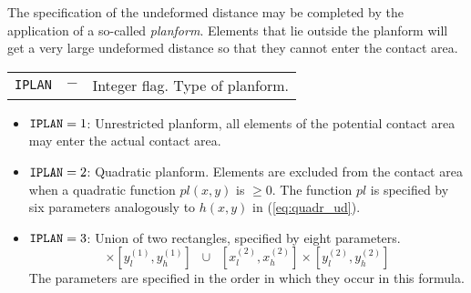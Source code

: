 \documentclass[12pt]{report}
\renewcommand{\magenta}[1]{}
\newenvironment{inputvars}{\vspace{0.4\baselineskip}%

\begin{tabular}{>{\raggedright}p{22mm}p{19mm}p{113mm}}}{
\end{tabular}

}
\newcommand{\inpvar}[3]{{\small\tt #1} & $#2$ & #3 \\[1ex]}
\begin{document}
The specification of the undeformed distance may be completed by the
application of a so-called {\em planform}. Elements that lie outside the
planform will get a very large undeformed distance so that they cannot
enter the contact area.
\begin{inputvars}
\inpvar{IPLAN}{-}{Integer flag. Type of planform.}
\end{inputvars}
\vspace{-2ex}
\begin{itemize}
\item ${\tt IPLAN}=1$: Unrestricted planform, all elements of the potential
        contact area may enter the actual contact area.
\item ${\tt IPLAN}=2$: Quadratic planform. Elements are excluded from the
        contact area when a qua\-dra\-tic function $pl(x,y)$ is $\ge 0$. The
        function $pl$ is specified by six parameters analogously to $h(x,y)$
        in (\ref{eq:quadr_ud}).
\item ${\tt IPLAN}=3$: Union of two rectangles, specified by eight parameters.
\begin{equation}
        [ x_l^{(1)}, x_h^{(1)} ] \times [ y_l^{(1)}, y_h^{(1)} ]
        \;\; \cup \;\;
        [ x_l^{(2)}, x_h^{(2)} ] \times [ y_l^{(2)}, y_h^{(2)} ]
\end{equation}
The parameters are specified in the order in which they occur in this
formula.
\magenta{
\item ${\tt IPLAN}=4$: Weighted interaction between $n_{patch}$ different
contact patches. Contact patches are given as rectangles
$[x_l^{(i)},x_h^{(i)}] \times[y_l^{(i)},y_h^{(i)}], i=1,n_{patch}$. 
The effect of pressures on normal displacements of different patches is
multiplied by factors $f_{i,j}\in[0,1]$, e.g.\
\begin{equation}
        n_{patch} = 3, \;\;
        \vec{x} = \left[ \begin{array}{cc} 
                -100, & 100 \\ 
                -100, & 100 \\
                -100, & 100 \\
                  \end{array} \right] , \;\;
        \vec{y} = \left[ \begin{array}{cc} 
                -100, & y_{1\text{--}2} \\ 
                y_{1\text{--}2}, & y_{2\text{--}3}  \\
                y_{2\text{--}3}, & 100 \\

\end{array}
\end{equation}}
\end{itemize}
\end{document}
